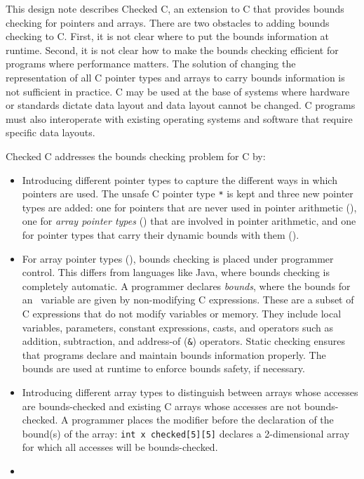 This design note describes Checked C, an extension to C that provides
bounds checking for pointers and arrays. There are two obstacles to
adding bounds checking to C. First, it is not clear where to put the
bounds information at runtime. Second, it is not clear how to make the
bounds checking efficient for programs where performance matters. The
solution of changing the representation of all C pointer types and
arrays to carry bounds information is not sufficient in practice. C may
be used at the base of systems where hardware or standards dictate data
layout and data layout cannot be changed. C programs must also
interoperate with existing operating systems and software that require
specific data layouts.

Checked C addresses the bounds checking problem for C by:

\begin{itemize}
\item
  Introducing different pointer types to capture the different ways in
  which pointers are used. The unsafe C pointer type \texttt{*} is kept
  and three new pointer types are added: one for pointers that are never
  used in pointer arithmetic (\ptr), one for \emph{array pointer
  types} (\arrayptr) that are involved in pointer arithmetic,
  and one for pointer types that carry their dynamic bounds with them
  (\arrayview ).
\item
  For array pointer types (\arrayptr), bounds checking is
  placed under programmer control. This differs from languages like
  Java, where bounds checking is completely automatic. A programmer
  declares \emph{bounds}, where the bounds for an \arrayptr\
  variable are given by non-modifying C expressions. These are a subset
  of C expressions that do not modify variables or memory. They include
  local variables, parameters, constant expressions, casts, and
  operators such as addition, subtraction, and address-of (\texttt{\&})
  operators. Static checking ensures that programs declare and maintain
  bounds information properly. The bounds are used at runtime to enforce
  bounds safety, if necessary.
\item
  Introducing different array types to distinguish between arrays whose
  accesses are bounds-checked and existing C arrays whose accesses are
  not bounds-checked. A programmer places the modifier 
  before the declaration of the bound(s) of the array: \texttt{int x
  checked[5][5]} declares a 2-dimensional array for which all
  accesses will be bounds-checked.
\item

\end{itemize}
